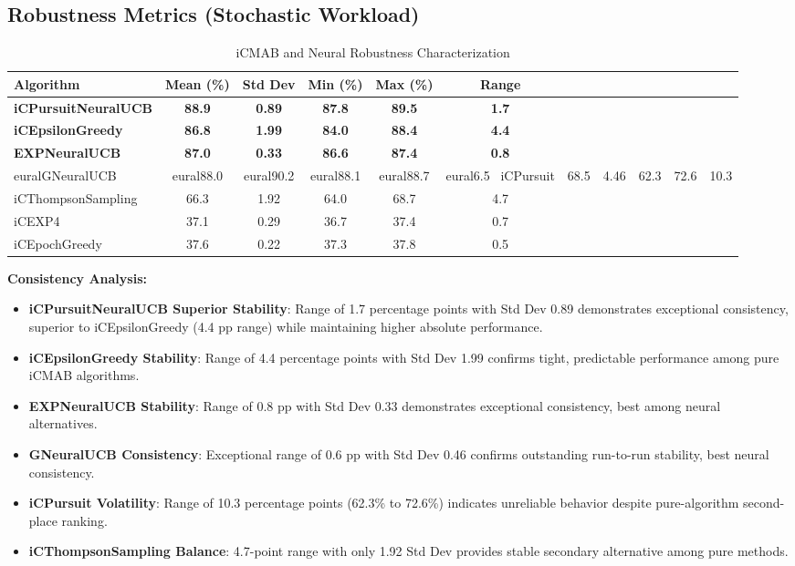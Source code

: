 \documentclass[12pt,a4paper]{article}
\newcommand{\secondarytext}[1]{\textcolor{secondaryblue}{\textbf{#1}}}
\newcommand{\success}[1]{\textcolor{accentgreen}{\textbf{#1}}}
\newcommand{\warning}[1]{\textcolor{warningred}{\textbf{#1}}}
\newcommand{\legacy}[1]{\textcolor{legacycolor}{\textbf{#1}}}
\newcommand{\neural}[1]{\textcolor{neuralcolor}{\textbf{#1}}}
\begin{document}
\subsection{Robustness Metrics (Stochastic Workload)}

\begin{table}[H]
\centering
\caption{iCMAB and Neural Robustness Characterization}
\label{tab:robustness}
\begin{tabular}{@{}lccccc@{}}
\toprule
\textbf{Algorithm} & \textbf{Mean (\%)} & \textbf{Std Dev} & \textbf{Min (\%)} & \textbf{Max (\%)} & \textbf{Range} \\
\midrule
\neural{iCPursuitNeuralUCB}   & \neural{88.9} & \neural{0.89} & \neural{87.8} & \neural{89.5} & \neural{1.7} \\
\success{iCEpsilonGreedy}   & \success{86.8} & \success{1.99} & \success{84.0} & \success{88.4} & \success{4.4} \\
\legacy{EXPNeuralUCB}       & \legacy{87.0} & \legacy{0.33} & \legacy{86.6} & \legacy{87.4} & \legacy{0.8} \\

eural{GNeuralUCB}            & 
eural{88.0} & 
eural{90.2} & 
eural{88.1} & 
eural{88.7} & 
eural{6.5} \
iCPursuit                   & 68.5 & 4.46 & 62.3 & 72.6 & 10.3 \\
iCThompsonSampling          & 66.3 & 1.92 & 64.0 & 68.7 & 4.7 \\
iCEXP4                      & 37.1 & 0.29 & 36.7 & 37.4 & 0.7 \\
iCEpochGreedy               & 37.6 & 0.22 & 37.3 & 37.8 & 0.5 \\
\bottomrule
\end{tabular}
\end{table}

\textbf{Consistency Analysis:}
\begin{itemize}
\item \neural{iCPursuitNeuralUCB Superior Stability}: Range of 1.7 percentage points with Std Dev 0.89 demonstrates exceptional consistency, superior to iCEpsilonGreedy (4.4 pp range) while maintaining higher absolute performance.
\item \success{iCEpsilonGreedy Stability}: Range of 4.4 percentage points with Std Dev 1.99 confirms tight, predictable performance among pure iCMAB algorithms.
\item \legacy{EXPNeuralUCB Stability}: Range of 0.8 pp with Std Dev 0.33 demonstrates exceptional consistency, best among neural alternatives.
\item \neural{GNeuralUCB Consistency}: Exceptional range of 0.6 pp with Std Dev 0.46 confirms outstanding run-to-run stability, best neural consistency.
\item \warning{iCPursuit Volatility}: Range of 10.3 percentage points (62.3\% to 72.6\%) indicates unreliable behavior despite pure-algorithm second-place ranking.
\item \secondarytext{iCThompsonSampling Balance}: 4.7-point range with only 1.92 Std Dev provides stable secondary alternative among pure methods.
\end{itemize}
\end{document}

